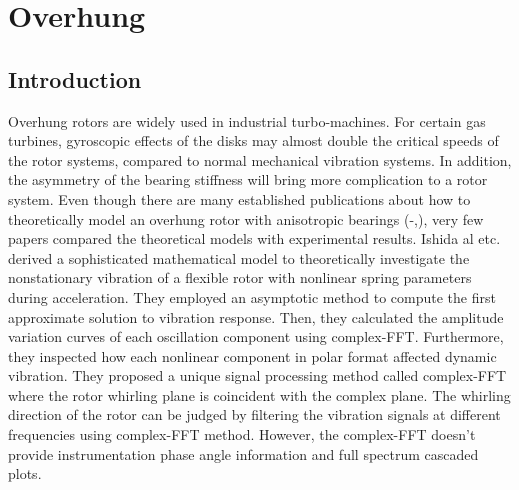 \chapter{Overhung}
	\section{Introduction}
		Overhung rotors are widely used in industrial turbo-machines. For certain gas turbines, gyroscopic effects of the disks may almost double the critical speeds of the rotor systems, compared to normal mechanical vibration systems. In addition, the asymmetry of the bearing stiffness will bring more complication to a rotor system. Even though there are many established publications about how to theoretically model an overhung rotor with anisotropic bearings (\cite{Genta}-\cite{Ishida},\cite{Dimarogonas}), very few papers compared the theoretical models with experimental results. Ishida al etc.\cite{Ishida} derived a sophisticated mathematical model to theoretically investigate the nonstationary vibration of a flexible rotor with nonlinear spring parameters during acceleration. They employed an asymptotic method to compute the first approximate solution to vibration response. Then, they calculated the amplitude variation curves of each oscillation component using complex-FFT. Furthermore, they inspected how each nonlinear component in polar format affected dynamic vibration. They proposed a unique signal processing method called complex-FFT where the rotor whirling plane is coincident with the complex plane. The whirling direction of the rotor can be judged by filtering the vibration signals at different frequencies using complex-FFT method. However, the complex-FFT doesn’t provide instrumentation phase angle information and full spectrum cascaded plots.
		\par
